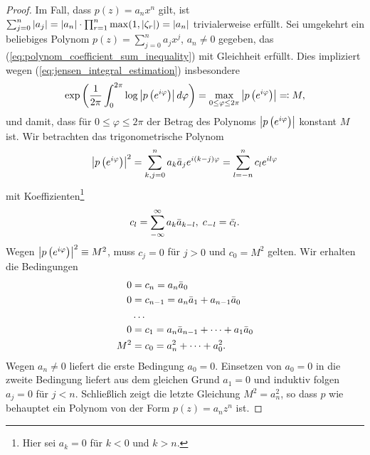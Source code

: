 \begin{proof}
    \noindent Im Fall, dass $p(z) = a_n x^n$ gilt, ist
    $ \sum_{j=0}^{n} \left\lvert a_j \right\rvert
      = \left\lvert a_n \right\rvert \cdot \prod_{r=1}^n \max(1, \left\lvert \zeta_r \right\rvert)
      = \left\lvert a_n \right\rvert $
    trivialerweise erfüllt.
    Sei umgekehrt  ein beliebiges Polynom
    $p(z) = \sum_{j=0}^n a_j x^j$, $a_n \neq 0$ gegeben, das
    (\ref{eq:polynom_coefficient_sum_inequality}) mit
    Gleichheit erfüllt.
    Dies impliziert wegen (\ref{eq:jensen_integral_estimation}) insbesondere
    \[
        \exp\left( \frac{1}{2\pi} \int_{0}^{2\pi} \log \left\lvert p\left( e^{i\varphi} \right) \right\rvert d\varphi \right)
        = \max_{0 \leq \varphi \leq 2\pi} \left\lvert p\left( e^{i\varphi} \right)  \right\rvert
        \eqqcolon M,
    \]
    und damit, dass für $0 \leq \varphi \leq 2 \pi$ der Betrag des Polynoms
    $\left\lvert p\left( e^{i\varphi} \right) \right\rvert$ konstant $M$ ist.
    Wir betrachten das trigonometrische Polynom
    \[
        \left\lvert p\left( e^{i\varphi} \right) \right\rvert^2
        = \sum_{k,j=0}^n a_k \bar{a}_j e^{i(k-j)\varphi}
        = \sum_{l=-n}^n c_l e^{i l \varphi}
    \]
    mit Koeffizienten\footnote{Hier sei $a_k = 0$ für $k<0$ und $k > n$.}
    \[
        c_l = \sum_{-\infty}^\infty a_k \bar{a}_{k-l}, \; c_{-l} = \bar{c_l}.
    \]
    Wegen $\left\lvert p\left( e^{i\varphi} \right) \right\rvert^2 \equiv M^2$, muss $c_j = 0$ für
    $j > 0$ und $c_0 = M^2$ gelten.
    Wir erhalten die Bedingungen
    \begin{equation*}
        \begin{split}
            0 &= c_n = a_n \bar{a}_0\\
            0 &= c_{n-1} = a_n \bar{a}_1 + a_{n-1} \bar{a}_0\\
              &\dots\\
            0 &= c_1 = a_n \bar{a}_{n-1} + \dots + a_{1} \bar{a}_0\\
            M^2 &= c_0 = a_n^2 + \dots + a_0^2.
        \end{split}
    \end{equation*}
    Wegen $a_n \neq 0$ liefert die erste Bedingung $a_0 = 0$.
    Einsetzen von $a_0 = 0$ in die zweite Bedingung liefert aus dem gleichen
    Grund $a_1 = 0$ und induktiv folgen $a_j = 0$ für $j < n$.
    Schließlich zeigt die letzte Gleichung $M^2 = a_n^2$, so dass $p$ wie
    behauptet ein Polynom von der Form $p(z) = a_n z^n$ ist.

\end{proof}

